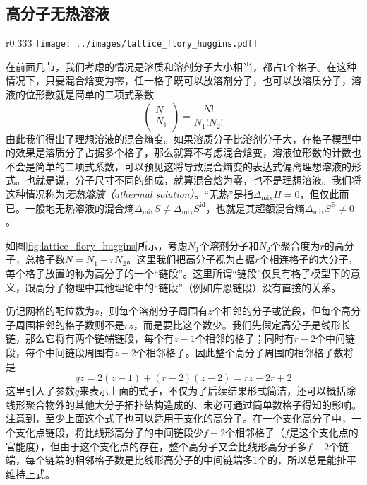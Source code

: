 \documentclass[main.tex]{subfiles}
\begin{document}
\subsection{高分子无热溶液}
\begin{wrapfigure}{r}{0.333\textwidth}
    \centering
    \texttt{[image: ../images/lattice\_flory\_huggins.pdf]}
    \caption{一条高分子链的链段在网格中的一种放置方式。}
    \label{fig:lattice_flory_huggins}
\end{wrapfigure}

在前面几节，我们考虑的情况是溶质和溶剂分子大小相当，都占1个格子。在这种情况下，只要混合焓变为零，任一格子既可以放溶剂分子，也可以放溶质分子，溶液的位形数就是简单的二项式系数
\[\left(\begin{array}{cc}N\\N_1\end{array}\right)=\frac{N!}{N_1!N_2!}\]
由此我们得出了理想溶液的混合熵变。如果溶质分子比溶剂分子大，在格子模型中的效果是溶质分子占据多个格子，那么就算不考虑混合焓变，溶液位形数的计数也不会是简单的二项式系数，可以预见这将导致混合熵变的表达式偏离理想溶液的形式。也就是说，分子尺寸不同的组成，就算混合焓为零，也不是理想溶液。我们将这种情况称为\emph{无热溶液（athermal solution）}。“无热”是指$\Delta_\text{mix}H=0$，但仅此而已。一般地无热溶液的混合熵$\Delta_\text{mix}S\neq\Delta_\text{mix}S^\text{id}$，也就是其超额混合熵$\Delta_\text{mix}S^\text{E}\neq 0$。

如图\ref{fig:lattice_flory_huggins}所示，考虑$N_1$个溶剂分子和$N_2$个聚合度为$r$的高分子，总格子数$N=N_1+rN_2$。这里我们把高分子视为占据$r$个相连格子的大分子，每个格子放置的称为高分子的一个“链段”。这里所谓“链段”仅具有格子模型下的意义，跟高分子物理中其他理论中的“链段”（例如库恩链段）没有直接的关系。

仍记网格的配位数为$z$，则每个溶剂分子周围有$z$个相邻的分子或链段，但每个高分子周围相邻的格子数则不是$rz$，而是要比这个数少。我们先假定高分子是线形长链，那么它将有两个链端链段，每个有$z-1$个相邻的格子；同时有$r-2$个中间链段，每个中间链段周围有$z-2$个相邻格子。因此整个高分子周围的相邻格子数将是
\[qz=2\left(z-1\right)+\left(r-2\right)\left(z-2\right)=rz-2r+2\]
这里引入了参数$q$来表示上面的式子，不仅为了后续结果形式简洁，还可以概括除线形聚合物外的其他大分子拓扑结构造成的、未必可通过简单数格子得知的影响。注意到，至少上面这个式子也可以适用于支化的高分子。在一个支化高分子中，一个支化点链段，将比线形高分子的中间链段少$f-2$个相邻格子（$f$是这个支化点的官能度），但由于这个支化点的存在，整个高分子又会比线形高分子多$f-2$个链端，每个链端的相邻格子数是比线形高分子的中间链端多1个的，所以总是能扯平维持上式。
\end{document}
